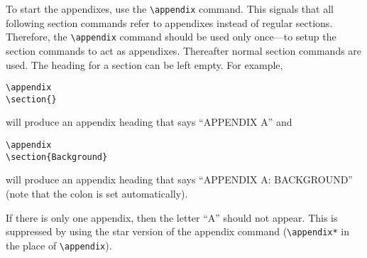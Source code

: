\documentclass[%
 reprint,
 amsmath,amssymb,
 aps,
]{revtex4-2}
\numberwithin{equation}{section}
\begin{document}
To start the appendixes, use the \verb+\appendix+ command.
This signals that all following section commands refer to appendixes
instead of regular sections. Therefore, the \verb+\appendix+ command
should be used only once---to setup the section commands to act as
appendixes. Thereafter normal section commands are used. The heading
for a section can be left empty. For example,
\begin{verbatim}
\appendix
\section{}
\end{verbatim}
will produce an appendix heading that says ``APPENDIX A'' and
\begin{verbatim}
\appendix
\section{Background}
\end{verbatim}
will produce an appendix heading that says ``APPENDIX A: BACKGROUND''
(note that the colon is set automatically).

If there is only one appendix, then the letter ``A'' should not
appear. This is suppressed by using the star version of the appendix
command (\verb+\appendix*+ in the place of \verb+\appendix+).

\nocite{*}

\end{document}
